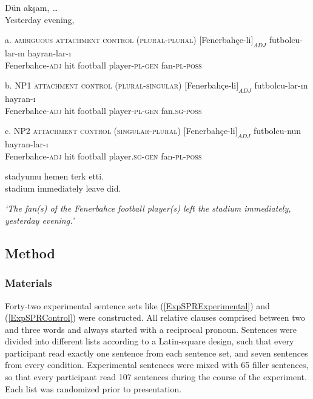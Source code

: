 \documentclass[english, doc]{apa7}\usepackage[]{graphicx}\usepackage[]{color}
\begin{document}
\begin{exe}
\ex \label{ExpSPRControl} 

\gll Dün akşam, \ldots \\
     Yesterday evening, {} \\
     
\begin{xlist} 

\item[a.]{}\textsc{ambiguous attachment control (plural-plural)}{} 
\gll $[$Fenerbahçe-li$]_{ADJ}$  futbolcu-lar-ın hayran-lar-ı \\
{Fenerbahce-\textsc{adj}} hit {football player}-\textsc{pl}-\textsc{gen} {fan}-\textsc{pl}-\textsc{poss}  \\

\item[b.]{}\textsc{NP1 attachment control (plural-singular)}{} 
\gll $[$Fenerbahçe-li$]_{ADJ}$  futbolcu-lar-ın hayran-ı \\
{Fenerbahce-\textsc{adj}} hit  {football player}-\textsc{pl}-\textsc{gen} {fan}.\textsc{sg}-\textsc{poss}  \\

\item[c.]{}\textsc{NP2 attachment control (singular-plural)}{} 
\gll $[$Fenerbahçe-li$]_{ADJ}$ futbolcu-nun hayran-lar-ı\\
{Fenerbahce-\textsc{adj}}  hit  {football player}.\textsc{sg}-\textsc{gen} {fan}-\textsc{pl}-\textsc{poss}  \\

\item[] \gll {\ldots} stadyumu hemen terk etti. \\
{}       stadium  immediately leave did. \\
\end{xlist}

\textit{`The fan(s) of the Fenerbahce football player(s) left the stadium immediately, yesterday evening.'}
\end{exe}



\subsection{Method}

\subsubsection{Materials}

Forty-two experimental sentence sets like (\ref{ExpSPRExperimental}) and (\ref{ExpSPRControl}) were constructed. All relative clauses comprised between two and three words and always started with a reciprocal pronoun. Sentences were divided into different lists according to a Latin-square design, such that every participant read exactly one sentence from each sentence set, and seven sentences from every condition. Experimental sentences were mixed with 65 filler sentences, so that every participant read 107 sentences during the course of the experiment. Each list was randomized prior to presentation.
\end{document}
